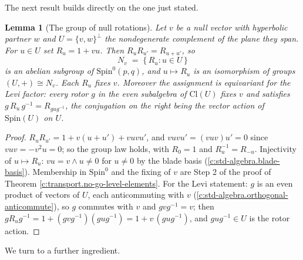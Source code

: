 \documentclass[11pt]{article}
\newtheorem{lemma}[theorem]{Lemma}
\theoremstyle{definition}
\theoremstyle{plain}
\newcommand{\changedmark}[2]{\marginpar{\raggedright\scriptsize\color{#1}#2}}
\providecommand{\Cl}{}\renewcommand{\Cl}{\mathrm{Cl}}
\providecommand{\Spin}{}\renewcommand{\Spin}{\mathrm{Spin}}
\begin{document}
The next result builds directly on the one just stated.

\begin{lemma}[The group of null rotations]\label{c:transport.group-null-rotations}
\changedmark{gray}{reworded}
Let $v$ be a null vector with hyperbolic partner $w$ and $U = \{v, w\}^{\perp}$ the nondegenerate complement of the plane they span. For $u \in U$ set $R_u = 1 + vu$. Then $R_u R_{u'} = R_{u + u'}$, so
\[
N_v \;=\; \{\, R_u : u \in U \,\}
\]
is an abelian subgroup of $\Spin^0(p,q)$, and $u \mapsto R_u$ is an isomorphism of groups $(U, +) \cong N_v$. Each $R_u$ fixes $v$. Moreover the assignment is equivariant for the Levi factor: every rotor $g$ in the even subalgebra of $\Cl(U)$ fixes $v$ and satisfies $g\, R_u\, g^{-1} = R_{g u g^{-1}}$, the conjugation on the right being the vector action of $\Spin(U)$ on $U$.
\end{lemma}
\begin{proof}
$R_u R_{u'} = 1 + v(u + u') + vuvu'$, and $vuvu' = (vuv)u' = 0$ since $vuv = -v^2u = 0$; so the group law holds, with $R_0 = 1$ and $R_u^{-1} = R_{-u}$. Injectivity of $u \mapsto R_u$: $vu = v \wedge u \neq 0$ for $u \neq 0$ by the blade basis (\ref{c:std-algebra.blade-basis}). Membership in $\Spin^0$ and the fixing of $v$ are Step 2 of the proof of Theorem \ref{c:transport.no-go-level-elements}. For the Levi statement: $g$ is an even product of vectors of $U$, each anticommuting with $v$ (\ref{c:std-algebra.orthogonal-anticommute}), so $g$ commutes with $v$ and $gvg^{-1} = v$; then $g R_u g^{-1} = 1 + (gvg^{-1})(gug^{-1}) = 1 + v\,(gug^{-1})$, and $gug^{-1} \in U$ is the rotor action.

\end{proof}

We turn to a further ingredient.
\end{document}
